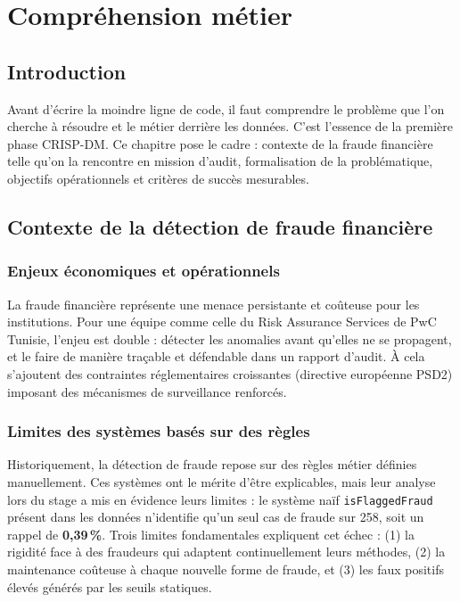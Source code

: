 \documentclass[12pt,a4paper,twoside]{report}
\begin{document}
\chapter{Compréhension métier}

\section{Introduction}

Avant d'écrire la moindre ligne de code, il faut comprendre le problème que l'on cherche à résoudre et le métier derrière les données. C'est l'essence de la première phase CRISP-DM. Ce chapitre pose le cadre : contexte de la fraude financière telle qu'on la rencontre en mission d'audit, formalisation de la problématique, objectifs opérationnels et critères de succès mesurables.

\section{Contexte de la détection de fraude financière}

\subsection{Enjeux économiques et opérationnels}

La fraude financière représente une menace persistante et coûteuse pour les institutions. Pour une équipe comme celle du Risk Assurance Services de PwC Tunisie, l'enjeu est double : détecter les anomalies avant qu'elles ne se propagent, et le faire de manière traçable et défendable dans un rapport d'audit. À cela s'ajoutent des contraintes réglementaires croissantes (directive européenne PSD2) imposant des mécanismes de surveillance renforcés.

\subsection{Limites des systèmes basés sur des règles}

Historiquement, la détection de fraude repose sur des règles métier définies manuellement. Ces systèmes ont le mérite d'être explicables, mais leur analyse lors du stage a mis en évidence leurs limites : le système naïf \texttt{isFlaggedFraud} présent dans les données n'identifie qu'un seul cas de fraude sur 258, soit un rappel de \textbf{0,39\,\%}. Trois limites fondamentales expliquent cet échec : (1) la rigidité face à des fraudeurs qui adaptent continuellement leurs méthodes, (2) la maintenance coûteuse à chaque nouvelle forme de fraude, et (3) les faux positifs élevés générés par les seuils statiques.
\end{document}

